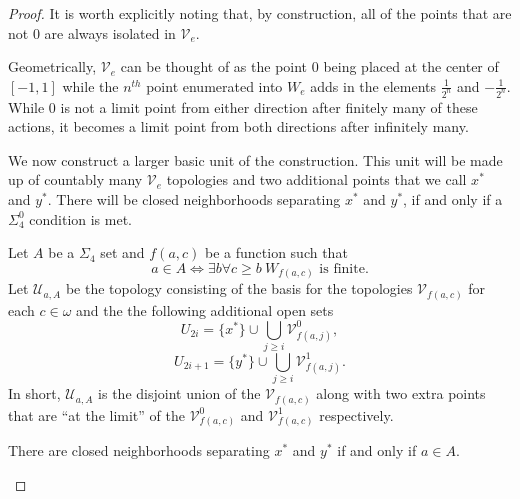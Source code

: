 \documentclass[11pt]{amsart}
\theoremstyle{remark}
\begin{document}
\begin{proof}
        It is worth explicitly noting that, by construction, all of the points that are not $0$ are always isolated in $\mathcal{V}_e$.

    Geometrically, $\mathcal{V}_e$ can be thought of as the point $0$ being placed at the center of $[-1,1]$ while the $n^{th}$ point enumerated into $W_e$ adds in the elements $\frac{1}{2^n}$ and $-\frac{1}{2^n}$.
    While $0$ is not a limit point from either direction after finitely many of these actions, it becomes a limit point from both directions after infinitely many.

    We now construct a larger basic unit of the construction.
    This unit will be made up of countably many $\mathcal{V}_e$ topologies and two additional points that we call $x^*$ and $y^*$.
    There will be closed neighborhoods separating $x^*$ and $y^*$, if and only if a $\Sigma_4^0$ condition is met.

    Let $A$ be a $\Sigma_4$ set and $f(a,c)$ be a function such that
    \[a\in A\iff \exists b\forall c\geq b ~ W_{f(a,c)} \text{ is finite.}\]
    Let $\mathcal{U}_{a,A}$ be the topology consisting of the basis for the topologies $\mathcal{V}_{f(a,c)}$ for each $c\in\omega$ and the the following additional open sets
    \[U_{2i}=\{x^*\}\cup \bigcup_{j\geq i}\mathcal{V}^0_{f(a,j)},\]
    \[U_{2i+1}=\{y^*\}\cup \bigcup_{j\geq i}\mathcal{V}^1_{f(a,j)}.\]
    In short, $\mathcal{U}_{a,A}$ is the disjoint union of the $\mathcal{V}_{f(a,c)}$ along with two extra points that are ``at the limit'' of the $\mathcal{V}^0_{f(a,c)}$ and $\mathcal{V}^1_{f(a,c)}$ respectively.

    \begin{claim}\label{claim:biggerUnit1/2}
        There are closed neighborhoods separating $x^*$ and $y^*$ if and only if $a\in A$.
    \end{claim}


\end{proof}
\end{document}
